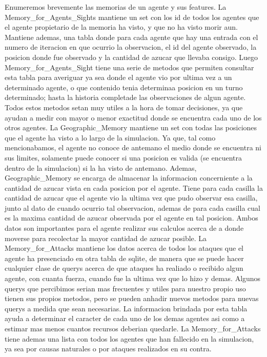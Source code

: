 \documentclass[11pt]{article}
\begin{document}
Enumeremos brevemente las memorias de un agente y sus features.
La Memory_for_Agents_Sights mantiene un set con los id de todos los agentes que el agente propietario de la memoria ha visto, y que no ha visto morir aun. Mantiene ademas, una tabla donde para cada agente que hay una entrada con el numero de iteracion en que ocurrio la observacion, el id del agente observado, la posicion donde fue observado y la cantidad de azucar que llevaba consigo. Luego Memory_for_Agents_Sight tiene una serie de metodos que permiten consultar esta tabla para averiguar ya sea donde el agente vio por ultima vez a un determinado agente, o que contenido tenia determinaa posicion en un turno determinado; hasta la historia completade las observaciones de algun agente. Todos estos metodos setan muy utiles a la hora de tomar decisiones, ya que ayudan a medir con mayor o menor exactitud donde se encuentra cada uno de los otros agentes.
La Geographic_Memory mantiene un set con todas las posiciones que el agente ha visto a lo largo de la simulacion. Ya que, tal como mencionabamos, el agente no conoce de antemano el medio donde se encuentra ni sus limites, solamente puede conocer si una posicion es valida (se encuentra dentro de la simulacion) si la ha visto de antemano. Ademas, Geographic_Memory se encarga de almacenar la informacion concerniente a la cantidad de azucar vista en cada posicion por el agente. Tiene para cada casilla la cantidad de azucar que el agente vio la ultima vez que pudo observar esa casilla, junto al dato de cuando ocurrio tal observacion, ademas de para cada casilla cual es la maxima cantidad de azucar observada por el agente en tal posicion. Ambos datos son importantes para el agente realizar sus calculos acerca de a donde moverse para recolectar la mayor cantidad de azucar posible.
La Memory_for_Attacks mantiene los datos acerca de todos los ataques que el agente ha presenciado en otra tabla de sqlite, de manera que se puede hacer cualquier clase de querys acerca de que ataques ha realiado o recibido algun agente, con cuanta fuerza, cuando fue la ultima vez que lo hizo y demas. Algunos querys que percibimos serian mas frecuentes y utiles para nuestro propio uso tienen sus propios metodos, pero se pueden anhadir nuevos metodos para nuevas querys a medida que sean necesarias. La informacion brindada por esta tabla ayuda a determinar el caracter de cada uno de los demas agentes asi como a estimar mas menos cuantos recursos deberian quedarle. La Memory_for_Attacks tiene ademas una lista con todos los agentes que han fallecido en la simulacion, ya sea por causas naturales o por ataques realizados en su contra.
\end{document}
